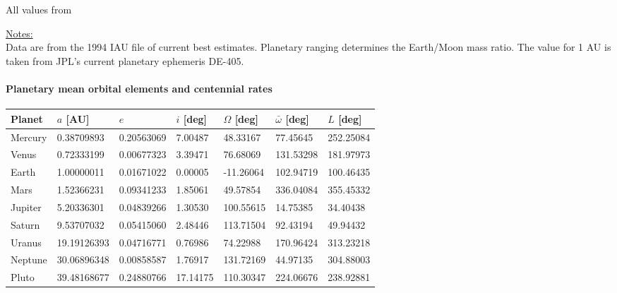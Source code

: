\documentclass[Orbiter User Manual.tex]{subfiles}
\begin{document}
All values from \cite{standish1995}

\underline{Notes:}\\
Data are from the 1994 IAU file of current best estimates. Planetary ranging
determines the Earth/Moon mass ratio. The value for 1 AU is taken from JPL's
current planetary ephemeris DE-405.

\paragraph{Planetary mean orbital elements and centennial rates}

	\begin{longtable}{ p{} p{} p{}
		p{} p{} p{} p{} }
	\hline
	\textbf{Planet} & \textbf{$a$ [AU]} & \textbf{$e$} & \textbf{$i$ [deg]} &
		\textbf{$\Omega$ [deg]} & \textbf{$\bar{\omega}$ [deg]} &
		\textbf{$L$ [deg]}\\
	\hline
	Mercury & 0.38709893 & 0.20563069 & 7.00487 & 48.33167 & 77.45645 &
		252.25084\\
	\hline
	Venus & 0.72333199 & 0.00677323 & 3.39471 & 76.68069 & 131.53298 &
		181.97973\\
	\hline
	Earth & 1.00000011 & 0.01671022 & 0.00005 & -11.26064 & 102.94719 &
		100.46435\\
	\hline
	Mars & 1.52366231 & 0.09341233 & 1.85061 & 49.57854 & 336.04084 &
		355.45332\\
	\hline
	Jupiter & 5.20336301 & 0.04839266 & 1.30530 & 100.55615 & 14.75385 &
		34.40438\\
	\hline
	Saturn & 9.53707032 & 0.05415060 & 2.48446 & 113.71504 & 92.43194 &
		49.94432\\
	\hline
	Uranus & 19.19126393 & 0.04716771 & 0.76986 & 74.22988 & 170.96424 &
		313.23218\\
	\hline
	Neptune & 30.06896348 & 0.00858587 & 1.76917 & 131.72169 & 44.97135 &
		304.88003\\
	\hline
	Pluto & 39.48168677 & 0.24880766 & 17.14175 & 110.30347 & 224.06676 &
		238.92881\\
	\hline
	\end{longtable}
\end{document}
